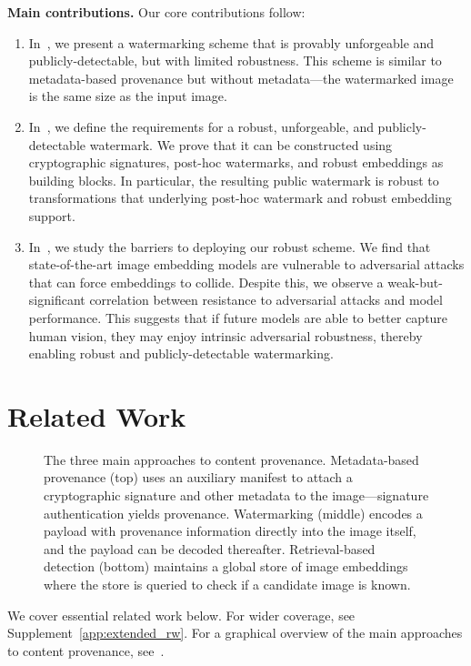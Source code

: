 \documentclass[12pt]{article}
\begin{document}
\textbf{Main contributions.} Our core contributions follow:
\begin{enumerate}
    \item In~, we present a watermarking scheme that is provably unforgeable and publicly-detectable, but with limited robustness.
    This scheme is similar to metadata-based provenance but without metadata---the watermarked image is the same size as the input image.
    \item In~, we define the requirements for a robust, unforgeable, and publicly-detectable watermark.
    We prove that it can be constructed using cryptographic signatures, post-hoc watermarks, and robust embeddings as building blocks.
    In particular, the resulting public watermark is robust to transformations that underlying post-hoc watermark and robust embedding support.
    \item In~, we study the barriers to deploying our robust scheme.
    We find that state-of-the-art image embedding models are vulnerable to adversarial attacks that can force embeddings to collide.
    Despite this, we observe a weak-but-significant correlation between resistance to adversarial attacks and model performance.
    This suggests that if future models are able to better capture human vision, they may enjoy intrinsic adversarial robustness, thereby enabling robust and publicly-detectable watermarking.
\end{enumerate}

\section{Related Work}
\begin{figure*}[t]
    \centering
    \caption{The three main approaches to content provenance. 
    Metadata-based provenance (top) uses an auxiliary manifest to attach a cryptographic signature and other metadata to the image---signature authentication yields provenance.
    Watermarking (middle) encodes a payload with provenance information directly into the image itself, and the payload can be decoded thereafter.
    Retrieval-based detection (bottom) maintains a global store of image embeddings where the store is queried to check if a candidate image is known.}
    \label{fig:misinformation_approaches}
\end{figure*}
We cover essential related work below.
For wider coverage, see Supplement~\ref{app:extended_rw}.
For a graphical overview of the main approaches to content provenance, see~.
\end{document}
